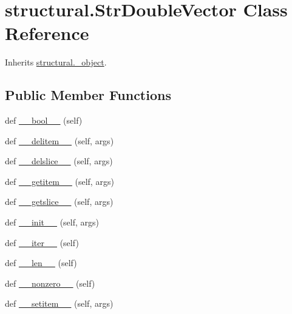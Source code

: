\hypertarget{classstructural_1_1_str_double_vector}{}\section{structural.\+Str\+Double\+Vector Class Reference}
\label{classstructural_1_1_str_double_vector}


Inherits \hyperlink{classstructural_1_1__object}{structural.\+\_\+object}.

\subsection*{Public Member Functions}
\begin{DoxyCompactItemize}
\item 
def \hyperlink{classstructural_1_1_str_double_vector_a8b03a02ecd4e39bdd130df1c027e7c01}{\+\_\+\+\_\+bool\+\_\+\+\_\+} (self)
\item 
def \hyperlink{classstructural_1_1_str_double_vector_a163677f7b11181073bc627cc34689928}{\+\_\+\+\_\+delitem\+\_\+\+\_\+} (self, args)
\item 
def \hyperlink{classstructural_1_1_str_double_vector_aeb99b3a1991c6150de928ba5bb4bcd35}{\+\_\+\+\_\+delslice\+\_\+\+\_\+} (self, args)
\item 
def \hyperlink{classstructural_1_1_str_double_vector_a17e1b22ede410bc90c04e304cba89db5}{\+\_\+\+\_\+getitem\+\_\+\+\_\+} (self, args)
\item 
def \hyperlink{classstructural_1_1_str_double_vector_ab3b6e7062c81664bec8cf3ed7b890c0a}{\+\_\+\+\_\+getslice\+\_\+\+\_\+} (self, args)
\item 
def \hyperlink{classstructural_1_1_str_double_vector_a3e1dbbb190ec7f44a7fde7b13119eacb}{\+\_\+\+\_\+init\+\_\+\+\_\+} (self, args)
\item 
def \hyperlink{classstructural_1_1_str_double_vector_ad7709a10f2fe6165fc5dede66ea13c1a}{\+\_\+\+\_\+iter\+\_\+\+\_\+} (self)
\item 
def \hyperlink{classstructural_1_1_str_double_vector_a6d0991a2dbcfa8b65204a67aa4d9b5a6}{\+\_\+\+\_\+len\+\_\+\+\_\+} (self)
\item 
def \hyperlink{classstructural_1_1_str_double_vector_a6e1b3310e218d7dc4e9861bf32fd9e11}{\+\_\+\+\_\+nonzero\+\_\+\+\_\+} (self)
\item 
def \hyperlink{classstructural_1_1_str_double_vector_af8c9fc656f3c73fdcef14f4c8bec6744}{\+\_\+\+\_\+setitem\+\_\+\+\_\+} (self, args)
\item 

\end{DoxyCompactItemize}

